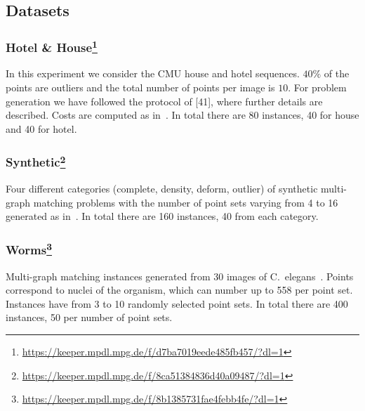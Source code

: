 \subsection{Datasets}

\subsubsection[Hotel \& House]{Hotel \& House\footnote{\url{https://keeper.mpdl.mpg.de/f/d7ba7019eede485fb457/?dl=1}}}
In this experiment we consider the CMU house and hotel sequences.
$40\%$ of the points are outliers and the total number of points per image is $10$. 
For problem generation we have followed the protocol of [41], where further details are described.
Costs are computed as in~\cite{yan2015multi}.
In total there are 80 instances, 40 for house and 40 for hotel.

\subsubsection[Synthetic]{Synthetic\footnote{\url{https://keeper.mpdl.mpg.de/f/8ca51384836d40a09487/?dl=1}}}
Four different categories (complete, density, deform, outlier) of synthetic multi-graph matching problems with the number of point sets varying from 4 to 16 generated as in~\cite{yan2015multi}.
In total there are 160 instances, 40 from each category.

\subsubsection[Worms]{Worms\footnote{\url{https://keeper.mpdl.mpg.de/f/8b1385731fae4febb4fe/?dl=1}}}
Multi-graph matching instances generated from 30 images of C.\ elegans~\cite{kainmueller2014active}.
Points correspond to nuclei of the organism, which can number up to 558 per point set.
Instances have from 3 to 10 randomly selected point sets.
In total there are 400 instances, 50 per number of point sets.

